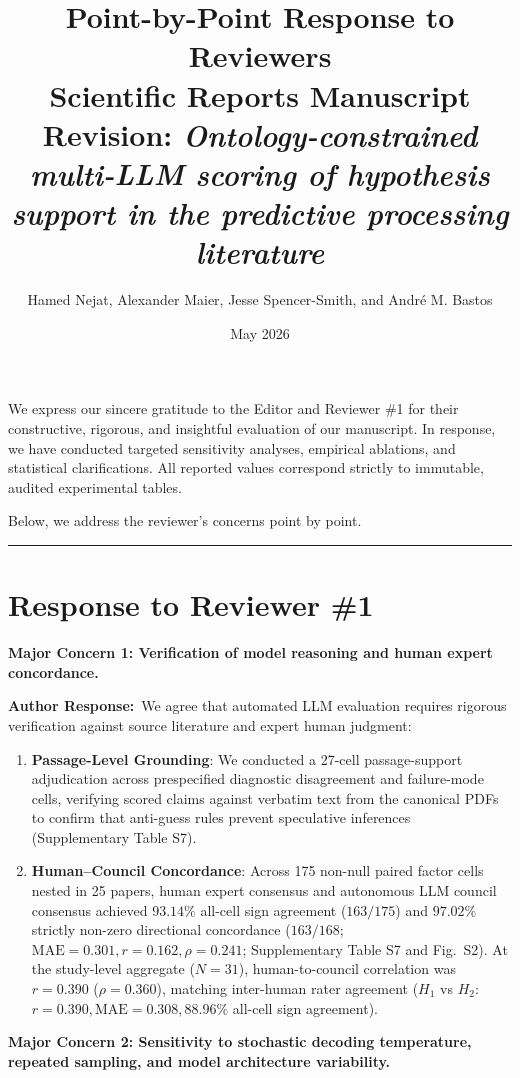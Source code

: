 \documentclass[11pt]{article}
\title{\textbf{Point-by-Point Response to Reviewers}\\
\large Scientific Reports Manuscript Revision: \emph{Ontology-constrained multi-LLM scoring of hypothesis support in the predictive processing literature}}
\author{Hamed Nejat, Alexander Maier, Jesse Spencer-Smith, and Andr\'e M. Bastos}
\date{May 2026}
\newcommand{\reviewercomment}[1]{\vspace{1em}\noindent\textbf{\color{blue!80!black}#1}\vspace{0.4em}}
\newcommand{\authorsresponse}{\noindent\textbf{\color{black}Author Response:}\ }
\begin{document}
\maketitle

We express our sincere gratitude to the Editor and Reviewer \#1 for their constructive, rigorous, and insightful evaluation of our manuscript. In response, we have conducted targeted sensitivity analyses, empirical ablations, and statistical clarifications. All reported values correspond strictly to immutable, audited experimental tables.

Below, we address the reviewer's concerns point by point.

\vspace{1.5em}
\hrule
\vspace{1.5em}

\section*{Response to Reviewer \#1}

\reviewercomment{Major Concern 1: Verification of model reasoning and human expert concordance.}

\authorsresponse We agree that automated LLM evaluation requires rigorous verification against source literature and expert human judgment:
\begin{enumerate}[leftmargin=*,noitemsep]
\item \textbf{Passage-Level Grounding}: We conducted a 27-cell passage-support adjudication across prespecified diagnostic disagreement and failure-mode cells, verifying scored claims against verbatim text from the canonical PDFs to confirm that anti-guess rules prevent speculative inferences (Supplementary Table S7).
\item \textbf{Human--Council Concordance}: Across 175 non-null paired factor cells nested in 25 papers, human expert consensus and autonomous LLM council consensus achieved $93.14\%$ all-cell sign agreement ($163/175$) and $97.02\%$ strictly non-zero directional concordance ($163/168$; $\text{MAE} = 0.301, r = 0.162, \rho = 0.241$; Supplementary Table S7 and Fig.~S2). At the study-level aggregate ($N=31$), human-to-council correlation was $r = 0.390$ ($\rho = 0.360$), matching inter-human rater agreement ($H_1$ vs $H_2$: $r = 0.390, \text{MAE} = 0.308, 88.96\%$ all-cell sign agreement).
\end{enumerate}

\reviewercomment{Major Concern 2: Sensitivity to stochastic decoding temperature, repeated sampling, and model architecture variability.}
\end{document}
